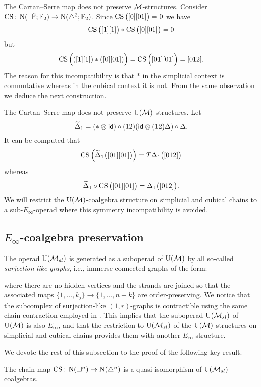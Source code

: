 \begin{example*}
	The Cartan--Serre map does not preserve $\mathcal{M}$-structures.
	Consider $\operatorname{CS} \colon \operatorname{N}(\square^2; {\mathbb{F}_2}) \to \operatorname{N}(\triangle^2; {\mathbb{F}_2})$.
	Since $\operatorname{CS} \big( [0][01] \big) = 0$ we have
	\[
	\operatorname{CS} \big( [1][1] \big) \ast \operatorname{CS} \big( [0][01] \big) = 0
	\]
	but
	\[
	\operatorname{CS} \Big( ([1][1]) \ast ([0][01]) \Big) =
	\operatorname{CS} \Big( [01][01] \Big) = [012].
	\]
	The reason for this incompatibility is that $\ast$ in the simplicial context is commutative whereas in the cubical context it is not.
	From the same observation we deduce the next construction.
\end{example*}

\begin{example*}
	The Cartan--Serre map does not preserve ${\operatorname{U}(\mathcal{M})}$-structures.
	Let
	\[
	\widetilde\Delta_1 = (\ast \otimes \mathsf{id}) \circ (12) (\mathsf{id} \otimes (12) \Delta) \circ \Delta.
	\]
	It can be computed that
	\[
	\operatorname{CS}\Big( \widetilde\Delta_1 \big( [01][01] \big) \Big) =
	T \Delta_1 \big( [012] \big)
	\]
	whereas
	\[
	\widetilde\Delta_1 \circ \operatorname{CS} \big( [01][01] \big) =
	\Delta_1 \big( [012] \big).
	\]
	We will restrict the ${\operatorname{U}(\mathcal{M})}$-coalgebra structure on simplicial and cubical chains to a sub-$E_\infty$-operad where this symmetry incompatibility is avoided.
\end{example*}

\subsection{$E_\infty$-coalgebra preservation}

The operad ${\operatorname{U}(\mathcal{M}_{sl})}$ is generated as a suboperad of ${\operatorname{U}(\mathcal{M})}$ by all so-called \textit{surjection-like graphs}, i.e., immerse connected graphs of the form:

where there are no hidden vertices and the strands are joined so that the associated maps $\{1, \dots, k_j\} \to \{1, \dots, n+k\}$ are order-preserving.
We notice that the subcomplex of surjection-like $(1,r)$-graphs is contractible using the same chain contraction employed in \cite{medina2020prop1}.
This implies that the suboperad ${\operatorname{U}(\mathcal{M}_{sl})}$ of ${\operatorname{U}(\mathcal{M})}$ is also $E_\infty$, and that the restriction to ${\operatorname{U}(\mathcal{M}_{sl})}$ of the ${\operatorname{U}(\mathcal{M})}$-structures on simplicial and cubical chains provides them with another $E_\infty$-structure.

We devote the rest of this subsection to the proof of the following key result.

\begin{theorem} \label{t:main local}
	The chain map $\operatorname{CS} \colon \operatorname{N}(\square^n) \to \operatorname{N}(\triangle^n)$ is a quasi-isomorphism of ${\operatorname{U}(\mathcal{M}_{sl})}$-coalgebras.
\end{theorem}

